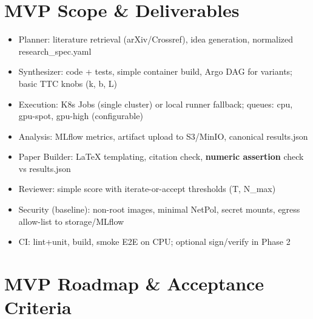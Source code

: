 \section{MVP Scope \& Deliverables}
\begin{itemize}[leftmargin=1.4em]
  \item Planner: literature retrieval (arXiv/Crossref), idea generation, normalized research\_spec.yaml
  \item Synthesizer: code + tests, simple container build, Argo DAG for variants; basic TTC knobs (k, b, L)
  \item Execution: K8s Jobs (single cluster) or local runner fallback; queues: cpu, gpu-spot, gpu-high (configurable)
  \item Analysis: MLflow metrics, artifact upload to S3/MinIO, canonical results.json
  \item Paper Builder: LaTeX templating, citation check, \textbf{numeric assertion} check vs results.json
  \item Reviewer: simple score with iterate-or-accept thresholds (T, N\_max)
  \item Security (baseline): non-root images, minimal NetPol, secret mounts, egress allow-list to storage/MLflow
  \item CI: lint+unit, build, smoke E2E on CPU; optional sign/verify in Phase 2
\end{itemize}

\section{MVP Roadmap \& Acceptance Criteria}
